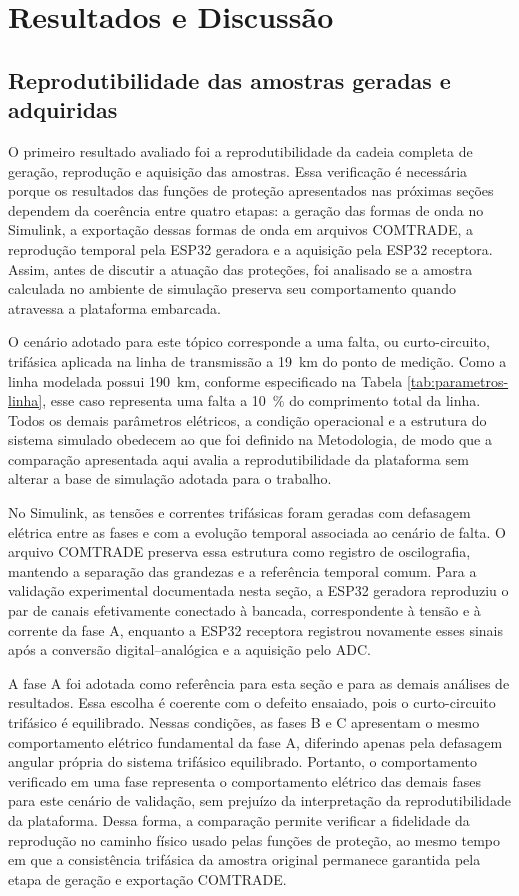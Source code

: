 \chapter{Resultados e Discussão}

\section{Reprodutibilidade das amostras geradas e adquiridas}
\label{sec:resultados-reprodutibilidade}

O primeiro resultado avaliado foi a reprodutibilidade da cadeia completa de geração, reprodução e aquisição das amostras. Essa verificação é necessária porque os resultados das funções de proteção apresentados nas próximas seções dependem da coerência entre quatro etapas: a geração das formas de onda no Simulink, a exportação dessas formas de onda em arquivos COMTRADE, a reprodução temporal pela ESP32 geradora e a aquisição pela ESP32 receptora. Assim, antes de discutir a atuação das proteções, foi analisado se a amostra calculada no ambiente de simulação preserva seu comportamento quando atravessa a plataforma embarcada.

O cenário adotado para este tópico corresponde a uma falta, ou curto-circuito, trifásica aplicada na linha de transmissão a \SI{19}{\kilo\metre} do ponto de medição. Como a linha modelada possui \SI{190}{\kilo\metre}, conforme especificado na Tabela \ref{tab:parametros-linha}, esse caso representa uma falta a \SI{10}{\percent} do comprimento total da linha. Todos os demais parâmetros elétricos, a condição operacional e a estrutura do sistema simulado obedecem ao que foi definido na Metodologia, de modo que a comparação apresentada aqui avalia a reprodutibilidade da plataforma sem alterar a base de simulação adotada para o trabalho.

No Simulink, as tensões e correntes trifásicas foram geradas com defasagem elétrica entre as fases e com a evolução temporal associada ao cenário de falta. O arquivo COMTRADE preserva essa estrutura como registro de oscilografia, mantendo a separação das grandezas e a referência temporal comum. Para a validação experimental documentada nesta seção, a ESP32 geradora reproduziu o par de canais efetivamente conectado à bancada, correspondente à tensão e à corrente da fase A, enquanto a ESP32 receptora registrou novamente esses sinais após a conversão digital--analógica e a aquisição pelo ADC.

A fase A foi adotada como referência para esta seção e para as demais análises de resultados. Essa escolha é coerente com o defeito ensaiado, pois o curto-circuito trifásico é equilibrado. Nessas condições, as fases B e C apresentam o mesmo comportamento elétrico fundamental da fase A, diferindo apenas pela defasagem angular própria do sistema trifásico equilibrado. Portanto, o comportamento verificado em uma fase representa o comportamento elétrico das demais fases para este cenário de validação, sem prejuízo da interpretação da reprodutibilidade da plataforma. Dessa forma, a comparação permite verificar a fidelidade da reprodução no caminho físico usado pelas funções de proteção, ao mesmo tempo em que a consistência trifásica da amostra original permanece garantida pela etapa de geração e exportação COMTRADE.

